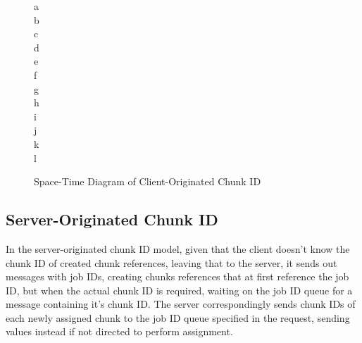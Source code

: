 \documentclass[a4paper,10pt]{article}
\begin{document}
\begin{figure}
\begin{minipage}{0.6\textwidth}
	\end{minipage}
	\begin{minipage}{0.4\textwidth}
		\begin{description}
			\item [\textcolor{dark2-1}{a}]
			\item [\textcolor{dark2-1}{b}] 
			\item [\textcolor{dark2-1}{c}] 
			\item [\textcolor{dark2-1}{d}] 
			\item [\textcolor{dark2-3}{e}] 
			\item [\textcolor{dark2-3}{f}] 
			\item [\textcolor{dark2-3}{g}] 
			\item [\textcolor{dark2-3}{h}] 
			\item [\textcolor{dark2-5}{i}] 
			\item [\textcolor{dark2-5}{j}] 
			\item [\textcolor{dark2-5}{k}] 
			\item [\textcolor{dark2-5}{l}] 
		\end{description}
	\end{minipage}
	\caption{\label{fig:mci} Space-Time Diagram of Client-Originated Chunk ID}
\end{figure}


\subsection{Server-Originated Chunk ID}

In the server-originated chunk ID model, given that the client doesn't know the
chunk ID of created chunk references, leaving that to the server, it sends out
messages with job IDs, creating chunks references that at first reference the
job ID, but when the actual chunk ID is required, waiting on the job ID queue
for a message containing it's chunk ID.
The server correspondingly sends chunk IDs of each newly assigned chunk to the
job ID queue specified in the request, sending values instead if not directed
to perform assignment.
\end{document}
